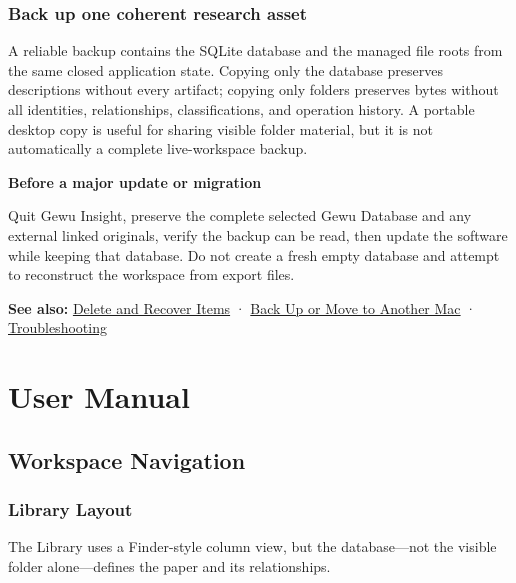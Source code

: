 \documentclass[10pt,letterpaper,oneside]{scrreprt}
\newenvironment{GewuRelated}{\par\nobreak\vspace{3pt}\nobreak\begingroup\small\sffamily\begin{samepage}\noindent}{\par\end{samepage}\endgroup}
\newenvironment{GewuLead}
  {\begin{list}{}{\leftmargin=0pt\rightmargin=0pt\topsep=0pt\partopsep=0pt\parsep=0pt}\item\relax
    \sffamily\fontsize{10.5}{13.2}\selectfont\color{GewuMuted}}
  {\end{list}}
\renewenvironment{quote}
  {\Needspace{5\baselineskip}\begin{tcolorbox}[enhanced,breakable,colback=GewuPale,colframe=GewuPale,boxrule=0pt,
    borderline west={1.6pt}{0pt}{GewuBlue},arc=1.2mm,left=2.5mm,right=2.5mm,top=1.7mm,bottom=1.7mm,
    before skip=4pt,after skip=5pt,fontupper=\color{GewuInk}\small]}
  {\end{tcolorbox}}
\begin{document}
\section{Back up one coherent research asset}\label{back-up-one-coherent-research-asset}

A reliable backup contains the SQLite database and the managed file roots from the same closed application state. Copying only the database preserves descriptions without every artifact; copying only folders preserves bytes without all identities, relationships, classifications, and operation history. A portable desktop copy is useful for sharing visible folder material, but it is not automatically a complete live-workspace backup.

\begin{quote}
\textbf{Before a major update or migration}

Quit Gewu Insight, preserve the complete selected Gewu Database and any external linked originals, verify the backup can be read, then update the software while keeping that database. Do not create a fresh empty database and attempt to reconstruct the workspace from export files.
\end{quote}

\begin{GewuRelated}
\textbf{See also:} \hyperref[recycle]{Delete and Recover Items} · \hyperref[backup-migrate]{Back Up or Move to Another Mac} · \hyperref[troubleshooting]{Troubleshooting}
\end{GewuRelated}

\part{User Manual}\label{part-3}

\chapter{Workspace Navigation}\label{chapter-11}

\section{Library Layout}\label{library-layout}

\begin{GewuLead}
The Library uses a Finder-style column view, but the database---not the visible folder alone---defines the paper and its relationships.
\end{GewuLead}
\end{document}
